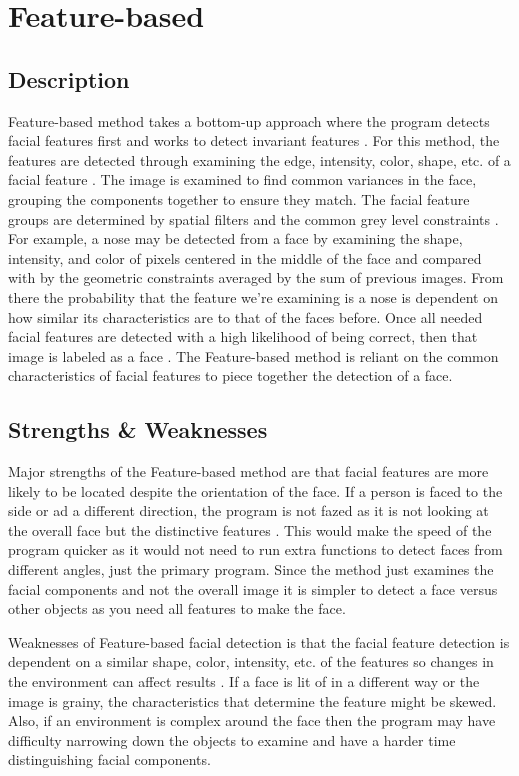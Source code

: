 \documentclass[onecolumn, draftclsnofoot,10pt, compsoc]{IEEEtran}
\begin{document}
\section{Feature-based}

\subsection{Description}
Feature-based method takes a bottom-up approach where the program detects facial features first and works to detect invariant features \cite{Medium}. For this method, the features are detected through examining the edge, intensity, color, shape, etc. of a facial feature \cite{Medium}. The image is examined to find common variances in the face, grouping the components together to ensure they match. The facial feature groups are determined by spatial filters and the common grey level constraints \cite{Study}. For example, a nose may be detected from a face by examining the shape, intensity, and color of pixels centered in the middle of the face and compared with by the geometric constraints averaged by the sum of previous images. From there the probability that the feature we're examining is a nose is dependent on how similar its characteristics are to that of the faces before. Once all needed facial features are detected with a high likelihood of being correct, then that image is labeled as a face \cite{Study}. The Feature-based method is reliant on the common characteristics of facial features to piece together the detection of a face.

\subsection{Strengths \& Weaknesses}
Major strengths of the Feature-based method are that facial features are more likely to be located despite the orientation of the face. If a person is faced to the side or ad a different direction, the program is not fazed as it is not looking at the overall face but the distinctive features \cite{Detection}. This would make the speed of the program quicker as it would not need to run extra functions to detect faces from different angles, just the primary program. Since the method just examines the facial components and not the overall image it is simpler to detect a face versus other objects as you need all features to make the face. 

Weaknesses of Feature-based facial detection is that the facial feature detection is dependent on a similar shape, color, intensity, etc. of the features so changes in the environment can affect results \cite{Study}. If a face is lit of in a different way or the image is grainy, the characteristics that determine the feature might be skewed. Also, if an environment is complex around the face then the program may have difficulty narrowing down the objects to examine and have a harder time distinguishing facial components.
\end{document}
